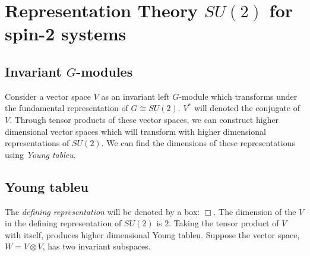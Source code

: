 \chapter{Representation Theory $SU(2)$ for spin-2 systems}
\section{Invariant $G$-modules}
Consider a vector space $V$ as an invariant left $G$-module which transforms under the fundamental representation of $G\cong SU(2)$. $V^*$ will denoted the conjugate of $V$. Through tensor products of these vector spaces, we can construct higher dimensional vector spaces which will transform with higher dimensional representations of $SU(2)$. We can find the dimensions of these representations using \textit{Young tableu}. 

\section{Young tableu}
The \textit{defining representation} will be denoted by a box: $\Box$. The dimension of the $V$ in the defining representation of $SU(2)$ is $2$. Taking the tensor product of $V$ with itself, produces higher dimensional Young tableu. Suppose the vector space, $W = V\otimes V$, has two invariant subspaces. 

